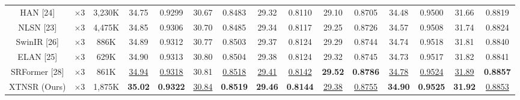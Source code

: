 \documentclass[twocolumn]{svjour3}          %
\begin{document}
\begin{table}
\begin{tabular}{|c|c|c|cc|cc|cc|cc|cc|cc|}
HAN [24] & $\times3$&3,230K& \multicolumn{1}{c|}{34.75} & 0.9299 & \multicolumn{1}{c|}{30.67} & 0.8483 &\multicolumn{1}{c|}{29.32} & 0.8110 & \multicolumn{1}{c|}{29.10} & 0.8705 & \multicolumn{1}{c|}{34.48} & 0.9500
&\multicolumn{1}{c|}{31.66} &0.8819\\

NLSN [23] & $\times3$ &4,475K& \multicolumn{1}{c|}{34.85} & 0.9306& \multicolumn{1}{c|}{30.70} &0.8485 &\multicolumn{1}{c|}{29.34} & 0.8117& \multicolumn{1}{c|}{29.25} & 0.8726& \multicolumn{1}{c|}{34.57} & 0.9508
&\multicolumn{1}{c|}{31.74} &0.8824\\


SwinIR [26] & $\times3$ &886K& \multicolumn{1}{c|}{34.89} & {0.9312} & \multicolumn{1}{c|}{30.77} &{0.8503} & \multicolumn{1}{c|}{29.37} & {0.8124} & {29.29} & {0.8744}& \multicolumn{1}{c|}{34.74} &{0.9518} &\multicolumn{1}{c|}{31.81} & {0.8840}\\

ELAN [25] & $\times 3$ &629K& \multicolumn{1}{c|}{34.90} & 0.9313 & \multicolumn{1}{c|}{30.80} & 0.8504 & \multicolumn{1}{c|}{29.38} & 0.8124 & \multicolumn{1}{c|}{29.32} &0.8745 & \multicolumn{1}{c|}{34.73} & 0.9517
&\multicolumn{1}{c|}{31.82} & 0.8841\\

SRFormer [28] & $\times 3$ &861K& \multicolumn{1}{c|}{\color{blue}\underline{34.94}} & {\color{blue}\underline{0.9318}} & \multicolumn{1}{c|}{30.81} &{\color{blue}\underline{ 0.8518}} & \multicolumn{1}{c|}{\color{blue}\underline{29.41}} & {\color{blue}\underline{0.8142}} & \multicolumn{1}{c|}{\color{red}\textbf{29.52}} & {\color{red}\textbf{0.8786}} & \multicolumn{1}{c|}{\color{blue}\underline{34.78}} &{\color{blue}\underline{0.9524}} &\multicolumn{1}{c|}{\color{blue}\underline{31.89}} & {\color{red}\textbf{ 0.8857}}\\

XTNSR (Ours) & $\times 3$ &1,875K& \multicolumn{1}{c|}{\color{red}\textbf{35.02}} &{\color{red}\textbf{0.9322}} & \multicolumn{1}{c|}{\color{blue}\underline{30.84} } &{\color{red}\textbf{ 0.8519}} & \multicolumn{1}{c|}{\color{red}\textbf{29.46}} &{\color{red}\textbf{0.8144}}& \multicolumn{1}{c|}{\color{blue}\underline{29.38}} &{\color{blue}\underline{0.8755}}& \multicolumn{1}{c|}{\color{red}\textbf{34.90}} &{\color{red}\textbf{0.9525}} &\multicolumn{1}{c|}{\color{red}\textbf{31.92}} & {\color{blue}\underline{0.8853}}\\


\end{tabular}
\end{table}
\end{document}
